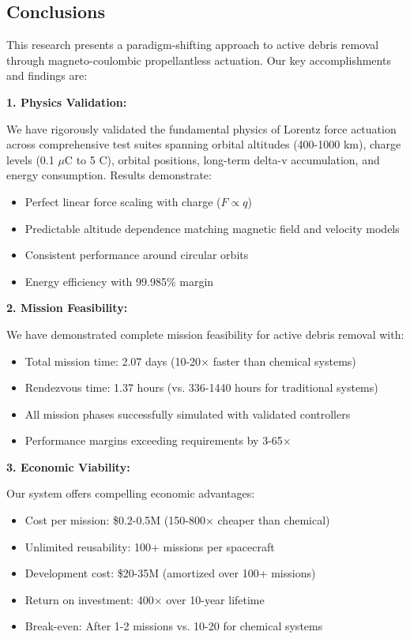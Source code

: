 \documentclass[12pt,a4paper]{article}
\begin{document}
\subsection{Conclusions}

This research presents a paradigm-shifting approach to active debris removal through magneto-coulombic propellantless actuation. Our key accomplishments and findings are:

\textbf{1. Physics Validation:}

We have rigorously validated the fundamental physics of Lorentz force actuation across comprehensive test suites spanning orbital altitudes (400-1000 km), charge levels (0.1 $\mu$C to 5 C), orbital positions, long-term delta-v accumulation, and energy consumption. Results demonstrate:
\begin{itemize}
\item Perfect linear force scaling with charge ($F \propto q$)
\item Predictable altitude dependence matching magnetic field and velocity models
\item Consistent performance around circular orbits
\item Energy efficiency with 99.985\% margin
\end{itemize}

\textbf{2. Mission Feasibility:}

We have demonstrated complete mission feasibility for active debris removal with:
\begin{itemize}
\item Total mission time: 2.07 days (10-20$\times$ faster than chemical systems)
\item Rendezvous time: 1.37 hours (vs. 336-1440 hours for traditional systems)
\item All mission phases successfully simulated with validated controllers
\item Performance margins exceeding requirements by 3-65$\times$
\end{itemize}

\textbf{3. Economic Viability:}

Our system offers compelling economic advantages:
\begin{itemize}
\item Cost per mission: \$0.2-0.5M (150-800$\times$ cheaper than chemical)
\item Unlimited reusability: 100+ missions per spacecraft
\item Development cost: \$20-35M (amortized over 100+ missions)
\item Return on investment: 400$\times$ over 10-year lifetime
\item Break-even: After 1-2 missions vs. 10-20 for chemical systems
\end{itemize}
\end{document}
